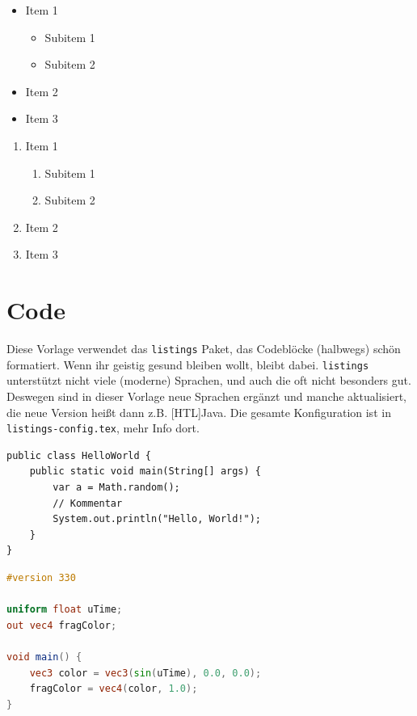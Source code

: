 \begin{itemize}
    \item Item 1
    \begin{itemize}
        \item Subitem 1
        \item Subitem 2
    \end{itemize}
    \item Item 2
    \item Item 3
\end{itemize}

\begin{enumerate}
    \item Item 1
    \begin{enumerate}
        \item Subitem 1
        \item Subitem 2
    \end{enumerate}
    \item Item 2
    \item Item 3
\end{enumerate}

\section{Code}

Diese Vorlage verwendet das \verb|listings| Paket, das Codeblöcke (halbwegs) schön formatiert. Wenn ihr geistig gesund bleiben wollt, bleibt dabei. \@\verb|listings| unterstützt nicht viele (moderne) Sprachen, und auch die oft nicht besonders gut. Deswegen sind in dieser Vorlage neue Sprachen ergänzt und manche aktualisiert, die neue Version heißt dann z.B. [HTL]Java. Die gesamte Konfiguration ist in \verb|listings-config.tex|, mehr Info dort.

\begin{lstlisting}[language={[HTL]Java}, caption={Beispielcode in Java}]
public class HelloWorld {
    public static void main(String[] args) {
        var a = Math.random();
        // Kommentar
        System.out.println("Hello, World!");
    }
}
\end{lstlisting}

\begin{lstlisting}[language=GLSL, caption={Beispielcode in GLSL}]
#version 330

uniform float uTime;
out vec4 fragColor;

void main() {
    vec3 color = vec3(sin(uTime), 0.0, 0.0);
    fragColor = vec4(color, 1.0);
}
\end{lstlisting}

